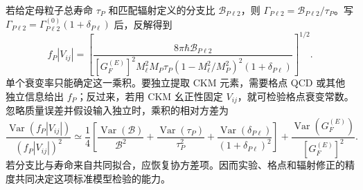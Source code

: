 若给定母粒子总寿命 $\tau_P$ 和匹配辐射定义的分支比 $\mathcal B_{P\ell2}$，则 $\Gamma_{P\ell2}=\mathcal B_{P\ell2}/\tau_P$。写 $\Gamma_{P\ell2}=\Gamma_{P\ell2}^{(0)}(1+\delta_{P\ell})$ 后，反解得到
\begin{equation}
 f_P|V_{ij}|=
 \left[\frac{8\pi\hbar\mathcal B_{P\ell2}}
 {[G_F^{(E)}]^2M_\ell^2M_P\tau_P
 (1-M_\ell^2/M_P^2)^2(1+\delta_{P\ell})}\right]^{1/2}.
 \label{eq:sm-pseudoscalar-ckm-extraction}
\end{equation}
单个衰变率只能确定这一乘积。要独立提取 CKM 元素，需要格点 QCD 或其他独立信息给出 $f_P$；反过来，若用 CKM 幺正性固定 $V_{ij}$，就可检验格点衰变常数。忽略质量误差并假设输入独立时，乘积的相对方差为
\begin{equation*}
 \frac{\operatorname{Var}(f_P|V_{ij}|)}{(f_P|V_{ij}|)^2}
 \simeq\frac14\left[
 \frac{\operatorname{Var}(\mathcal B)}{\mathcal B^2}
 +\frac{\operatorname{Var}(\tau_P)}{\tau_P^2}
 +\frac{\operatorname{Var}(\delta_{P\ell})}{(1+\delta_{P\ell})^2}\right]
 +\frac{\operatorname{Var}(G_F^{(E)})}{[G_F^{(E)}]^2}.
\end{equation*}
若分支比与寿命来自共同拟合，应恢复协方差项。因而实验、格点和辐射修正的精度共同决定这项标准模型检验的能力。
